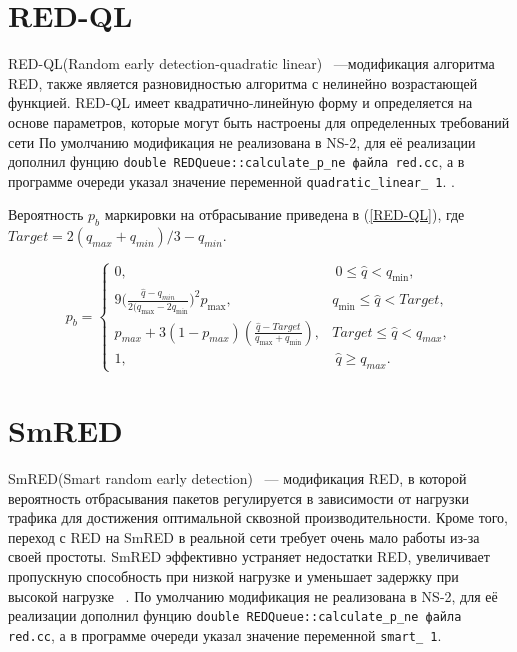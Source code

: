 \section{RED-QL}

RED-QL(Random early detection-quadratic linear) ~---модификация алгоритма RED, также является разновидностью алгоритма с нелинейно возрастающей функцией. RED-QL имеет квадратично-линейную форму и определяется на основе параметров, которые могут быть настроены для определенных требований сети\citep{REDQL} По умолчанию модификация не реализована в NS-2, для её реализации дополнил фунцию \verb|double REDQueue::calculate_p_ne файла red.cc|, а в программе очереди указал значение переменной \verb|quadratic_linear_ 1|. . 

Вероятность $p_{b}$ маркировки на отбрасывание приведена в (\ref{RED-QL}), где $ Target = 2(q_{max} + q_{min})/3 - q_{min} $.

\begin{equation}
\label{RED-QL}
p_{b} = \begin{cases}
        0, &  \ 0 \leqslant \hat{q} < q_{\min},
        \\
        9({\frac{\hat{q} - q_{min}}{2(q_{\max} - 2q_{\min}})^2} {p_{\max}}, &  q_{\min} \leqslant  \hat{q} < {Target},
        \\
        p_{max} + 3(1-p_{max}) (\frac{\hat{q} - Target}{q_{\max} + q_{\min}}), & {Target} \leqslant  \hat{q} < q_{max},
        \\
        1, &  \ \hat{q} \geqslant q_{max}.
\end{cases}
\end{equation}

\section{SmRED}

SmRED(Smart random early detection) ~--- модификация RED, в которой
вероятность отбрасывания пакетов регулируется в зависимости от нагрузки трафика для достижения оптимальной сквозной производительности.
Кроме того, переход с RED на SmRED в реальной сети требует очень мало работы из-за своей простоты. SmRED эффективно устраняет недостатки
RED, увеличивает пропускную способность при низкой нагрузке и уменьшает задержку при высокой нагрузке ~\citep{SmRED}. По умолчанию модификация не реализована в NS-2, для её реализации дополнил фунцию \verb|double REDQueue::calculate_p_ne файла red.cc|, а в программе очереди указал значение переменной \verb|smart_ 1|. 

